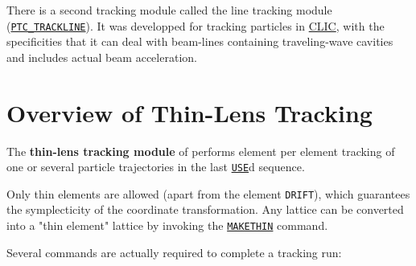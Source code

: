 There is a second \ptc tracking module called the line tracking module
(\hyperref[sec:ptc-trackline]{\texttt{PTC\_TRACKLINE}}). It was developped
for tracking particles in
\href{http://clic-study.web.cern.ch/CLIC-Study/}{CLIC}, with the
specificities that it can deal with beam-lines containing traveling-wave
cavities and includes actual beam acceleration. 



\section{Overview of Thin-Lens Tracking} %
\label{sec:trackoverview}

The \textbf{thin-lens tracking module} of \madx performs element per
element tracking of one or several particle trajectories in the last
\hyperref[sec:use]{\texttt{USE}}d sequence.  
 

Only thin elements are allowed (apart from the element \texttt{DRIFT}),
which guarantees the symplecticity of the coordinate transformation. Any
lattice can be converted into a "thin element" lattice by invoking the
\hyperref[chap:makethin]{\texttt{MAKETHIN}} command. 

Several commands are actually required to complete a tracking run:



